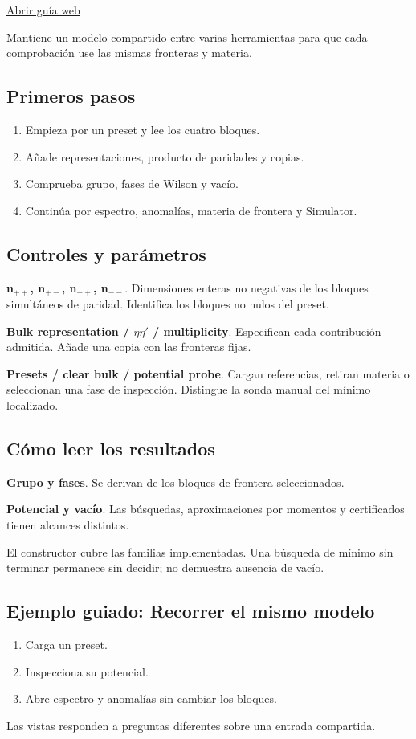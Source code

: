 \documentclass[11pt,a4paper]{article}
\begin{document}
\href{https://karlesmarin.github.io/ghu-explorer/guide/es/sun5d/index.html}{Abrir guía web}

Mantiene un modelo compartido entre varias herramientas para que cada comprobación use las mismas fronteras y materia.
\subsection*{Primeros pasos}
\begin{enumerate}
\item Empieza por un preset y lee los cuatro bloques.
\item Añade representaciones, producto de paridades y copias.
\item Comprueba grupo, fases de Wilson y vacío.
\item Continúa por espectro, anomalías, materia de frontera y Simulator.
\end{enumerate}
\subsection*{Controles y parámetros}
\textbf{n\ensuremath{{}_{++}}, n\ensuremath{{}_{+-}}, n\ensuremath{{}_{-+}}, n\ensuremath{{}_{--}}}. Dimensiones enteras no negativas de los bloques simultáneos de paridad. Identifica los bloques no nulos del preset.

\textbf{Bulk representation / \ensuremath{\eta}\ensuremath{\eta}\ensuremath{\prime} / multiplicity}. Especifican cada contribución admitida. Añade una copia con las fronteras fijas.

\textbf{Presets / clear bulk / potential probe}. Cargan referencias, retiran materia o seleccionan una fase de inspección. Distingue la sonda manual del mínimo localizado.

\subsection*{Cómo leer los resultados}
\textbf{Grupo y fases}. Se derivan de los bloques de frontera seleccionados.

\textbf{Potencial y vacío}. Las búsquedas, aproximaciones por momentos y certificados tienen alcances distintos.

El constructor cubre las familias implementadas. Una búsqueda de mínimo sin terminar permanece sin decidir; no demuestra ausencia de vacío.
\subsection*{Ejemplo guiado: Recorrer el mismo modelo}
\begin{enumerate}
\item Carga un preset.
\item Inspecciona su potencial.
\item Abre espectro y anomalías sin cambiar los bloques.
\end{enumerate}
Las vistas responden a preguntas diferentes sobre una entrada compartida.
\end{document}
